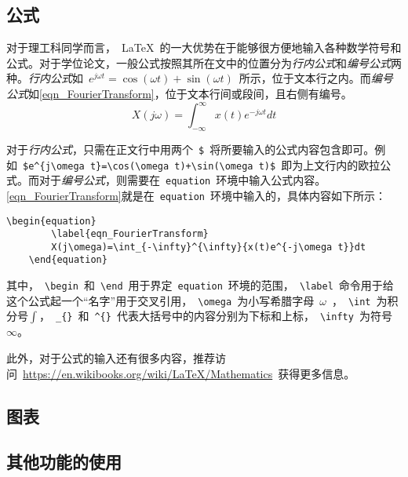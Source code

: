 \subsection{公式}
\label{Subsect_InsertFormula}
对于理工科同学而言，~\LaTeX~的一大优势在于能够很方便地输入各种数学符号和公式。对于学位论文，一般公式按照其所在文中的位置分为\emph{行内公式}和\emph{编号公式}两种。\emph{行内公式}如~$e^{j\omega t}=\cos(\omega t)+\sin(\omega t)$~所示，位于文本行之内。而\emph{编号公式}如\cref{eqn_FourierTransform}，位于文本行间或段间，且右侧有编号。
\begin{equation}
	\label{eqn_FourierTransform}
	X(j\omega)=\int_{-\infty}^{\infty}{x(t)e^{-j\omega t}}dt
\end{equation}


对于\emph{行内公式}，只需在正文行中用两个~\verb|$|~将所要输入的公式内容包含即可。例如~\verb|$e^{j\omega t}=\cos(\omega t)+\sin(\omega t)$|~即为上文行内的欧拉公式。而对于\emph{编号公式}，则需要在~\verb|equation|~环境中输入公式内容。\cref{eqn_FourierTransform}就是在~\verb|equation|~环境中输入的，具体内容如下所示：
\begin{Verbatim}[gobble=1,frame=single]
	\begin{equation}
		\label{eqn_FourierTransform}
		X(j\omega)=\int_{-\infty}^{\infty}{x(t)e^{-j\omega t}}dt
	\end{equation}
\end{Verbatim}
其中，~\verb|\begin|~和~\verb|\end|~用于界定~\verb|equation|~环境的范围，~\verb|\label|~命令用于给这个公式起一个“名字”用于交叉引用，~\verb|\omega|~为小写希腊字母~$\omega$~，~\verb|\int|~为积分号$\int$，~\verb|_{}|~和~\verb|^{}|~代表大括号中的内容分别为下标和上标，~\verb|\infty|~为符号$\infty$。


此外，对于公式的输入还有很多内容，推荐访问~\url{https://en.wikibooks.org/wiki/LaTeX/Mathematics}~获得更多信息。

\subsection{图表}
\label{Subsect_InsertFigureTable}

\subsection{其他功能的使用}
\label{Subsect_OtherFunctions}
